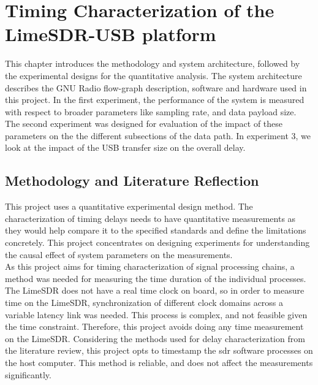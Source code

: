 \chapter{Timing Characterization of the LimeSDR-USB platform}
This chapter introduces the methodology and system architecture, followed by the experimental designs for the quantitative analysis.
The system architecture describes the GNU Radio flow-graph description, software and hardware used in this project.
In the first experiment, the performance of the system is measured with respect to broader parameters like sampling rate, and data payload size. The second experiment was designed for evaluation of the impact of these parameters on the the different subsections of the data path.
In experiment 3, we look at the impact of the USB transfer size on the overall delay.

\section{Methodology and Literature Reflection}
This project uses a quantitative experimental design method.
The characterization of timing delays needs to have quantitative measurements as they would help compare it to the specified standards and define the limitations concretely.
This project concentrates on designing experiments for understanding the causal effect of system parameters on the measurements.\\

As this project aims for timing characterization of signal processing chains, a  method was needed for measuring the time duration of the individual processes.
The LimeSDR does not have a real time clock on board, so in order to measure time on the LimeSDR, synchronization of different clock domains across a variable latency link was needed.
This process is complex, and not feasible given the time constraint.
Therefore, this project avoids doing any time measurement on the LimeSDR.
Considering the methods used for delay characterization from the literature review, this project opts to timestamp the \ac{sdr} software processes on the host computer.
This method is reliable, and does not affect the measurements significantly.\\

